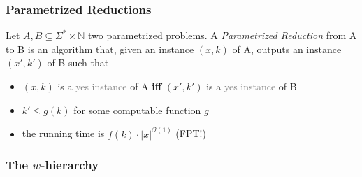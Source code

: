 \subsubsection{Parametrized Reductions}
\begin{definition} Let $A,B\subseteq \Sigma^*\times\mathbb{N}$ two parametrized problems. A \textit{Parametrized Reduction} from A to B is an algorithm that, given an instance $(x,k)$ of A, outputs an instance $(x', k')$ of B such that

    \begin{itemize}
        \item $(x,k)$ is a \textcolor{gray}{yes instance} of A \textbf{iff} $(x',k')$ is a \textcolor{gray}{yes instance} of B
        \item $k' \leq g(k)$ for some computable function $g$
        \item the running time is $f(k)\cdot |x|^{\mathcal{O}(1)}$ (FPT!)
    \end{itemize}
\end{definition}
    \subsubsection{The $w$-hierarchy}

